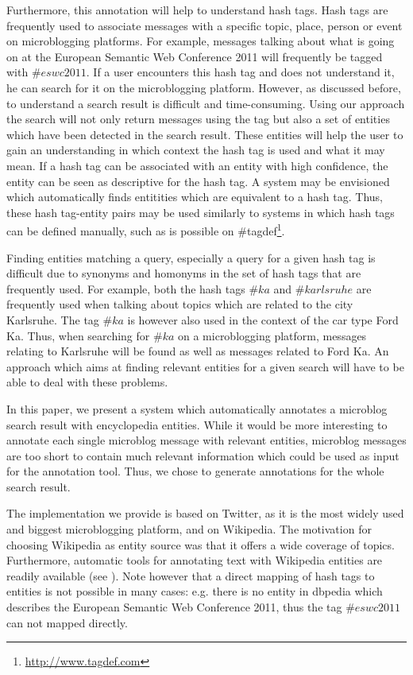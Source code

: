 \documentclass{llncs}
\begin{document}
Furthermore, this annotation will help to understand hash tags. Hash tags are frequently used to associate messages with a specific topic, place, person or event on microblogging platforms. For example, messages talking about what is going on at the European Semantic Web Conference 2011 will frequently be tagged with $\#eswc2011$. If a user encounters this hash tag and does not understand it, he can search for it on the microblogging platform. However, as discussed before, to understand a search result is difficult and time-consuming. Using our approach the search will not only return messages using the tag but also a set of entities which have been detected in the search result. These entities will help the user to gain an understanding in which context the hash tag is used and what it may mean. If a hash tag can be associated with an entity with high confidence, the entity can be seen as descriptive for the hash tag. A system may be envisioned which automatically finds entitities which are equivalent to a hash tag. Thus, these hash tag-entity pairs may be used similarly to systems in which hash tags can be defined manually, such as is possible on \#tagdef\footnote{\url{http://www.tagdef.com}}.

Finding entities matching a query, especially a query for a given hash tag is difficult due to synonyms and homonyms in the set of hash tags that are frequently used. For example, both the hash tags $\#ka$ and $\#karlsruhe$ are frequently used when talking about topics which are related to the city Karlsruhe. The tag $\#ka$ is however also used in the context of the car type Ford Ka. Thus, when searching for $\#ka$ on a microblogging platform, messages relating to Karlsruhe will be found as well as messages related to Ford Ka. An approach which aims at finding relevant entities for a given search will have to be able to deal with these problems. 

In this paper, we present a system which automatically annotates a microblog search result with encyclopedia entities. While it would be more interesting to annotate each single microblog message with relevant entities, microblog messages are too short to contain much relevant information which could be used as input for the annotation tool. Thus, we chose to generate annotations for the whole search result. 

The implementation we provide is based on Twitter, as it is the most widely used and biggest microblogging platform, and on Wikipedia. The motivation for choosing Wikipedia as entity source was that it offers a wide coverage of topics. Furthermore, automatic tools for annotating text with Wikipedia entities are readily available (see \cite{key:wikifier}). Note however that a direct mapping of hash tags to entities is not possible in many cases: e.g. there is no entity in dbpedia which describes the European Semantic Web Conference 2011, thus the tag $\#eswc2011$ can not mapped directly.
\end{document}
